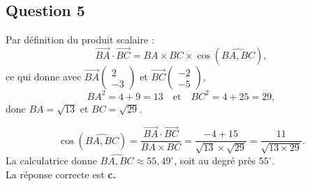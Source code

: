 \documentclass[10pt]{article}
\begin{document}
\subsection*{Question 5}
Par définition du produit scalaire :
	\[ \overrightarrow{BA} \cdot \overrightarrow{BC} = BA \times BC \times \cos(\widehat{BA, BC}), \]
	ce qui donne avec \(\overrightarrow{BA} \left( \begin{array}{c} 2 \\ -3 \end{array} \right)\) et \(\overrightarrow{BC} \left( \begin{array}{c} -2 \\ -5 \end{array} \right)\),
	\[ BA^2 = 4 + 9 = 13 \quad \text{et} \quad BC^2 = 4 + 25 = 29, \]
donc \(BA = \sqrt{13}\) et \(BC = \sqrt{29}\).
	
\[ \cos(\widehat{BA, BC}) = \dfrac{\overrightarrow{BA} \cdot \overrightarrow{BC}}{BA \times BC} = \dfrac{-4 + 15}{\sqrt{13} \times \sqrt{29}} = \dfrac{11}{\sqrt{13 \times 29}}. \]
La calculatrice donne \(\widehat{BA, BC} \approx 55,49^\circ\), soit au degré près $55^\circ$.\\
 La réponse correcte est \textbf{c.}
\end{document}

